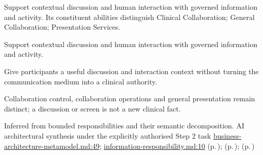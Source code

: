 Support contextual discussion and human interaction with governed information and activity. Its constituent abilities distinguish Clinical Collaboration; General Collaboration; Presentation Services.



Support contextual discussion and human interaction with governed information and activity.



Give participants a useful discussion and interaction context without turning the communication medium into a clinical authority.



Collaboration control, collaboration operations and general presentation remain distinct; a discussion or screen is not a new clinical fact.


Inferred from bounded responsibilities and their semantic decomposition. AI architectural synthesis under the explicitly authorised Step 2 task \hyperref[evidence:4bac85accd34ce0b]{business-architecture-metamodel.md:49}; \hyperref[evidence:be61392fefb4bb10]{information-responsibility.md:10}
 (p.\,\pageref{cap:bec-clinical-collaboration});  (p.\,\pageref{cap:bec-general-collaboration});  (p.\,\pageref{cap:bec-presentation-services})
